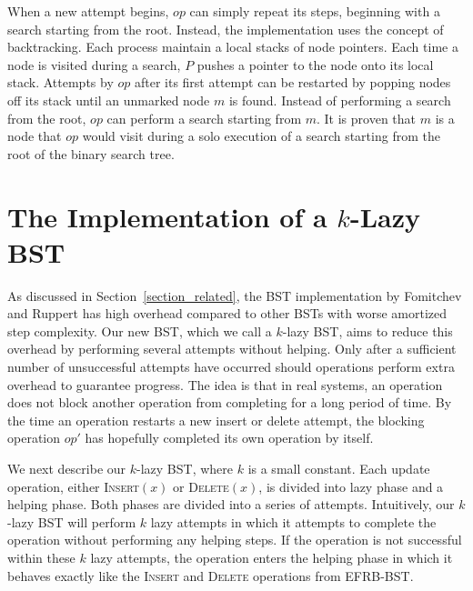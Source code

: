 \documentclass[letterpaper,twocolumn]{article}
\begin{document}
When a new attempt begins, $op$ can simply repeat its steps, beginning with a search starting from the root. Instead, the implementation uses the concept of backtracking. Each process maintain a local stacks of node pointers. Each time a node is visited during a search, $P$ pushes a pointer to the node onto its local stack. Attempts by $op$ after its first attempt can be restarted by popping nodes off its stack until an unmarked node $m$ is found. Instead of performing a search from the root, $op$ can perform a search starting from $m$. It is proven that $m$ is a node that $op$ would visit during a solo execution of a search starting from the root of the binary search tree.


\section{The Implementation of a $k$-Lazy BST}\label{section_implementation}
As discussed in Section~\ref{section_related}, the BST implementation by Fomitchev and Ruppert has high overhead compared to other BSTs with worse amortized step complexity. Our new BST, which we call a $k$-lazy BST, aims to reduce this overhead by performing several attempts without helping. Only after a sufficient number of unsuccessful attempts have occurred should operations perform extra overhead to guarantee progress. The idea is that in real systems, an operation does not block another operation from completing for a long period of time. By the time an operation restarts a new insert or delete attempt, the blocking operation $op'$ has hopefully completed its own operation by itself. 

We next describe our $k$-lazy BST, where $k$ is a small constant. Each update operation, either \textsc{Insert}$(x)$ or \textsc{Delete}$(x)$, is divided into lazy phase and a helping phase. Both phases are divided into a series of attempts. Intuitively, our $k$-lazy BST will perform $k$ lazy attempts in which it attempts to complete the operation without performing any helping steps. If the operation is not successful within these $k$ lazy attempts, the operation enters the helping phase in which it behaves exactly like the \textsc{Insert} and \textsc{Delete} operations from EFRB-BST.
\end{document}
